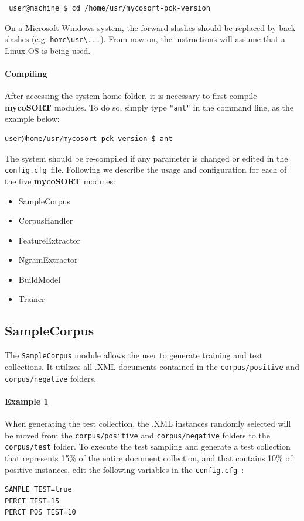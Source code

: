 \documentclass[11pt]{article}
\newcommand{\mycos}{{\bf{mycoSORT{ }}}}
\newcommand{\configfile}{\texttt{config.cfg{ }}}
\begin{document}
\begin{lstlisting}
 user@machine $ cd /home/usr/mycosort-pck-version 
\end{lstlisting}

On a Microsoft Windows system, the forward slashes should be replaced by back slashes
(e.g. \texttt{home\textbackslash usr\textbackslash ...}). 
From now on, the instructions will assume that a Linux OS is being used.

\paragraph{Compiling} 
After accessing the system home folder, it is necessary to first compile \mycos{} modules.
To do so, simply type \texttt{"ant"} in the command line, as the example below:
\begin{lstlisting}
user@home/usr/mycosort-pck-version $ ant
\end{lstlisting}
The system should be re-compiled if any parameter is changed or edited in the \configfile file.
Following we describe the usage and configuration for each of the five \mycos{} modules:
\begin{itemize}
\item SampleCorpus
\item CorpusHandler
\item FeatureExtractor
\item NgramExtractor
\item BuildModel
\item Trainer
\end{itemize}


\subsection{SampleCorpus} 
The \texttt{SampleCorpus} module allows the user to generate training and test collections. 
It utilizes all .XML documents contained in the \texttt{corpus/positive} and \texttt{corpus/negative} folders.
\paragraph{Example 1}
When generating the test collection, the .XML instances randomly selected will be moved 
from the \texttt{corpus/positive} and \texttt{corpus/negative} folders to the 
\texttt{corpus/test} folder.
To execute the test sampling and generate a test collection that represents
15\% of the entire document collection, and that contains 10\% of positive instances, 
edit the following variables in the \configfile:
\begin{lstlisting}
SAMPLE_TEST=true
PERCT_TEST=15
PERCT_POS_TEST=10
\end{lstlisting}
\end{document}
